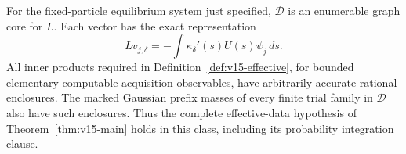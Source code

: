 \begin{theorem}
\label{thm:v15-constructive-core}
For the fixed-particle equilibrium system just specified, $\mathscr D$
is an enumerable graph core for $L$. Each vector has the exact
representation
\begin{equation}\label{eq:v15-effective-core}
 Lv_{j,\delta}=-\int\kappa_\delta'(s)U(s)\psi_j\,ds.
\end{equation}
All inner products required in Definition~\ref{def:v15-effective},
for bounded elementary-computable acquisition observables, have
arbitrarily accurate rational enclosures. The marked Gaussian prefix
masses of every finite trial family in $\mathscr D$ also have such
enclosures. Thus the complete effective-data hypothesis of
Theorem~\ref{thm:v15-main} holds in this class, including its probability
integration clause.
\end{theorem}
